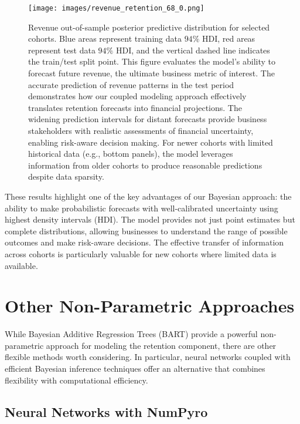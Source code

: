\documentclass[11pt]{amsart}
\theoremstyle{definition}
\begin{document}
\begin{figure}
    \centering
    \texttt{[image: images/revenue\_retention\_68\_0.png]}
    \caption{Revenue out-of-sample posterior predictive distribution for selected cohorts. Blue areas represent training
        data $94\%$ HDI, red areas represent test data $94\%$ HDI, and the vertical dashed line indicates the train/test
        split point. This figure evaluates the model's ability to forecast future revenue, the ultimate business metric
        of interest. The accurate prediction of revenue patterns in the test period demonstrates how our coupled modeling
        approach effectively translates retention forecasts into financial projections. The widening prediction intervals
        for distant forecasts provide business stakeholders with realistic assessments of financial uncertainty, enabling
        risk-aware decision making. For newer cohorts with limited historical data (e.g., bottom panels), the model
        leverages information from older cohorts to produce reasonable predictions despite data sparsity.}
    \label{fig:out_sample_revenue}
\end{figure}

These results highlight one of the key advantages of our Bayesian approach: the ability to make probabilistic forecasts with
well-calibrated uncertainty using highest density intervals (HDI). The model provides not just point estimates but complete
distributions, allowing businesses to understand the range of possible outcomes and make risk-aware decisions. The effective
transfer of information across cohorts is particularly valuable for new cohorts where limited data is available.

\section{Other Non-Parametric Approaches}

While Bayesian Additive Regression Trees (BART) provide a powerful non-parametric approach for modeling the retention
component, there are other flexible methods worth considering. In particular, neural networks coupled with efficient
Bayesian inference techniques offer an alternative that combines flexibility with computational efficiency.

\subsection{Neural Networks with NumPyro}
\end{document}
